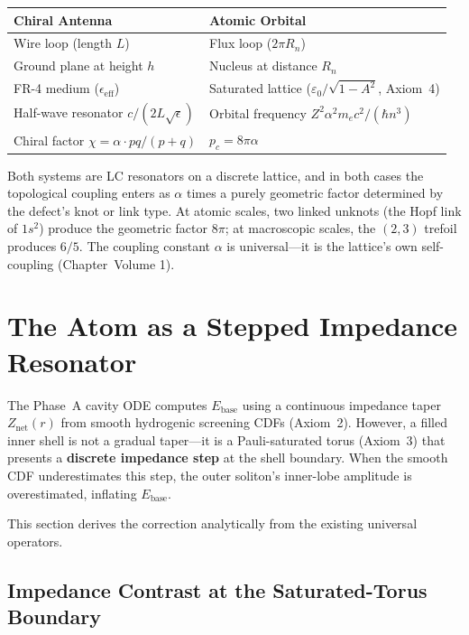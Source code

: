 \begin{center}
\small
\renewcommand{\arraystretch}{1.2}
\begin{tabular}{ll}
\toprule
\textbf{Chiral Antenna} & \textbf{Atomic Orbital} \\
\midrule
Wire loop (length $L$) & Flux loop ($2\pi R_n$) \\
Ground plane at height $h$ & Nucleus at distance $R_n$ \\
FR-4 medium ($\epsilon_\text{eff}$) & Saturated lattice ($\varepsilon_0 / \sqrt{1 - A^2}$, Axiom~4) \\
Half-wave resonator $c/(2L\sqrt{\epsilon})$ & Orbital frequency $Z^2\alpha^2 m_e c^2/(\hbar n^3)$ \\
Chiral factor $\chi = \alpha \cdot pq/(p+q)$ & $p_c = 8\pi\alpha$ \\
\bottomrule
\end{tabular}
\end{center}

\noindent Both systems are LC resonators on a discrete lattice, and in both cases the topological coupling enters as $\alpha$ times a purely geometric factor determined by the defect's knot or link type. At atomic scales, two linked unknots (the Hopf link of $1s^2$) produce the geometric factor $8\pi$; at macroscopic scales, the $(2,3)$ trefoil produces $6/5$. The coupling constant $\alpha$ is universal---it is the lattice's own self-coupling (Chapter~Volume 1).

\section{The Atom as a Stepped Impedance Resonator}
\label{sec:sir_atom}

The Phase~A cavity ODE computes $E_\text{base}$ using a continuous impedance taper $Z_\text{net}(r)$ from smooth hydrogenic screening CDFs (Axiom~2).  However, a filled inner shell is not a gradual taper---it is a Pauli-saturated torus (Axiom~3) that presents a \textbf{discrete impedance step} at the shell boundary.  When the smooth CDF underestimates this step, the outer soliton's inner-lobe amplitude is overestimated, inflating $E_\text{base}$.

This section derives the correction analytically from the existing universal operators.

\subsection{Impedance Contrast at the Saturated-Torus Boundary}

